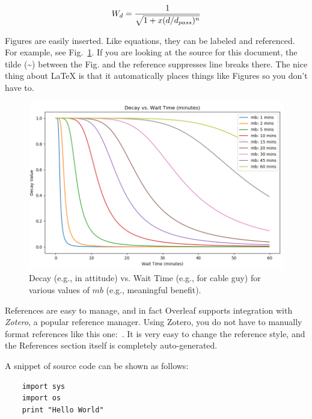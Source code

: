 \documentclass[letterpaper,12pt]{article}
\begin{document}
\begin{equation}\label{eq:test_equation}
W_d = \dfrac{1}{\sqrt{1 + x(d/d_{pass})^n}}
\vspace{0.2in}
\end{equation}

Figures are easily inserted.  Like equations, they can be labeled and referenced.  For example, see Fig.~\ref{fig:butterworth_wait}.  If you are looking at the source for this document, the tilde (\~{})
between the Fig. and the reference suppresses line breaks there.  The nice thing about {\LaTeX}  
is that it automatically places things like Figures so you don't have to.


\begin{figure}[ht] 
\centering\includegraphics[width=1.0\columnwidth]{butterworth_wait}
\caption{Decay (e.g., in attitude) vs. Wait Time (e.g., for cable guy) for various values of $mb$ (e.g., meaningful benefit). \label{fig:butterworth_wait}}
\end{figure}

References are easy to manage, and in fact Overleaf supports integration with \textit{Zotero}, a popular reference manager. Using Zotero, you do not have to manually format references like this one:~\cite{knuth:1984}. It is very easy to change the reference style, and the References section itself is completely auto-generated. 

A snippet of source code can be shown as follows:

\linespread{1}\begin{verbatim}
    import sys
    import os
    print "Hello World"
\end{verbatim}
\end{document}
